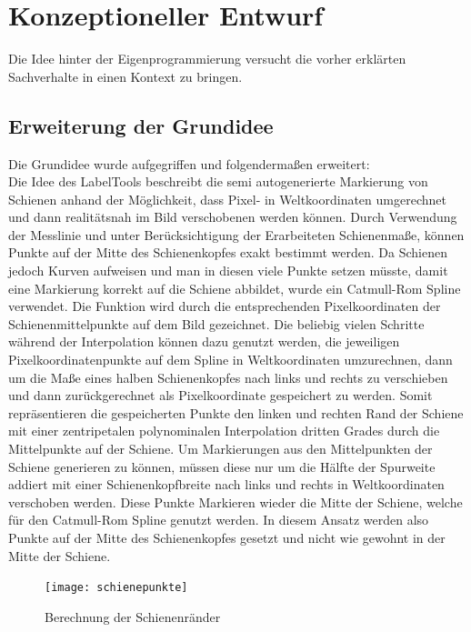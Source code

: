 \documentclass[11pt]{scrartcl}
\begin{document}
\newpage
\section{Konzeptioneller Entwurf }
\label{sec:Konzeptioneller Entwurf}

Die Idee hinter der Eigenprogrammierung versucht die vorher erklärten Sachverhalte in einen Kontext zu bringen. 

\subsection{Erweiterung der Grundidee}
\label{sec:Erweiterung der Grundidee}

\noindent
Die Grundidee wurde aufgegriffen und folgendermaßen erweitert:
\\
Die Idee des LabelTools beschreibt die semi autogenerierte Markierung von Schienen anhand der Möglichkeit, dass Pixel- in Weltkoordinaten umgerechnet und dann realitätsnah im Bild verschobenen werden können. Durch Verwendung der Messlinie und unter Berücksichtigung der Erarbeiteten Schienenmaße, können Punkte auf der Mitte des Schienenkopfes exakt bestimmt werden. Da Schienen jedoch Kurven aufweisen und man in diesen viele Punkte setzen müsste, damit eine Markierung korrekt auf die Schiene abbildet, wurde ein Catmull-Rom Spline verwendet. Die Funktion wird durch die entsprechenden Pixelkoordinaten der Schienenmittelpunkte auf dem Bild gezeichnet. Die beliebig vielen Schritte während der Interpolation können dazu genutzt werden, die jeweiligen Pixelkoordinatenpunkte auf dem Spline in Weltkoordinaten umzurechnen, dann um die Maße eines halben Schienenkopfes nach links und rechts zu verschieben und dann zurückgerechnet als Pixelkoordinate gespeichert zu werden. Somit repräsentieren die gespeicherten Punkte den linken und rechten Rand der Schiene mit einer zentripetalen polynominalen Interpolation dritten  Grades durch die Mittelpunkte auf der Schiene. Um Markierungen aus den Mittelpunkten der Schiene generieren zu können, müssen diese nur um die Hälfte der Spurweite addiert mit einer Schienenkopfbreite nach links und rechts in Weltkoordinaten verschoben werden. Diese Punkte Markieren wieder die Mitte der Schiene, welche für den Catmull-Rom Spline genutzt werden. In diesem Ansatz werden also Punkte auf der Mitte des Schienenkopfes gesetzt und nicht wie gewohnt in der Mitte der Schiene.

\begin{figure}[H]
  \texttt{[image: schienepunkte]}
  \caption{Berechnung der Schienenränder}
\end{figure}
\end{document}
